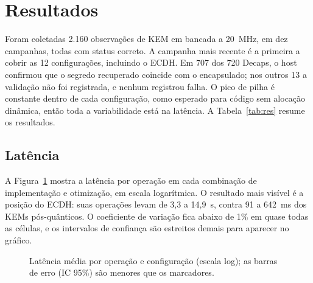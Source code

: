 \documentclass[acmsmall,nonacm,language=english,language=brazilian]{acmart}
\begin{document}
\section{Resultados}
\label{sec:res}
Foram coletadas 2.160 observações de KEM em bancada a 20~MHz, em dez
campanhas, todas com status correto. A campanha mais recente é a primeira a
cobrir as 12 configurações, incluindo o ECDH. Em 707 dos 720 \textsf{Decaps},
o host confirmou que o segredo recuperado coincide com o encapsulado; nos
outros 13 a validação não foi registrada, e nenhum registrou falha. O pico de
pilha é constante dentro de cada configuração, como esperado para código sem
alocação dinâmica, então toda a variabilidade está na latência. A
Tabela~\ref{tab:res} resume os resultados.

\begin{table}[t]
  \caption{Latência por operação (média $\pm$ IC 95\%, $t$ de Student), pico
  de pilha e Flash ocupada, a 20~MHz. $N$ é o número de repetições por
  operação.}
  \label{tab:res}
  \small
  
\end{table}

\subsection{Latência}
A Figura~\ref{fig:lat} mostra a latência por operação em cada combinação de
implementação e otimização, em escala logarítmica. O resultado mais visível é
a posição do ECDH: suas operações levam de 3,3 a 14,9~s, contra 91 a 642~ms
dos KEMs pós-quânticos. O coeficiente de variação fica abaixo de 1\% em quase
todas as células, e os intervalos de confiança são estreitos demais para
aparecer no gráfico.

\begin{figure}[t]
  \centering
  
  \caption{Latência média por operação e configuração (escala log); as
  barras de erro (IC 95\%) são menores que os marcadores.}
  \label{fig:lat}
\end{figure}
\end{document}
